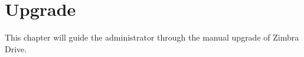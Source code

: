 \chapter{Upgrade}
This chapter will guide the administrator through the manual upgrade of Zimbra Drive.




